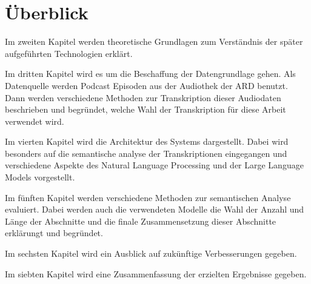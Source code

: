 \section{Überblick}

Im zweiten Kapitel werden theoretische Grundlagen zum Verständnis der später aufgeführten Technologien erklärt.

Im dritten Kapitel wird es um die Beschaffung der Datengrundlage gehen. Als Datenquelle werden Podcast Episoden aus der Audiothek der ARD benutzt. 
Dann werden verschiedene Methoden zur Transkription dieser Audiodaten beschrieben und begründet, welche Wahl der Transkription für diese Arbeit verwendet wird.

Im vierten Kapitel wird die Architektur des Systems dargestellt. 
Dabei wird besonders auf die semantische analyse der Transkriptionen eingegangen und verschiedene Aspekte des Natural Language Processing und der Large Language Models vorgestellt.

Im fünften Kapitel werden verschiedene Methoden zur semantischen Analyse evaluiert.
Dabei werden auch die verwendeten Modelle die Wahl der Anzahl und Länge der Abschnitte und die finale Zusammensetzung dieser Abschnitte erklärungt und begründet.

Im sechsten Kapitel wird ein Ausblick auf zukünftige Verbesserungen gegeben.

Im siebten Kapitel wird eine Zusammenfassung der erzielten Ergebnisse gegeben.
